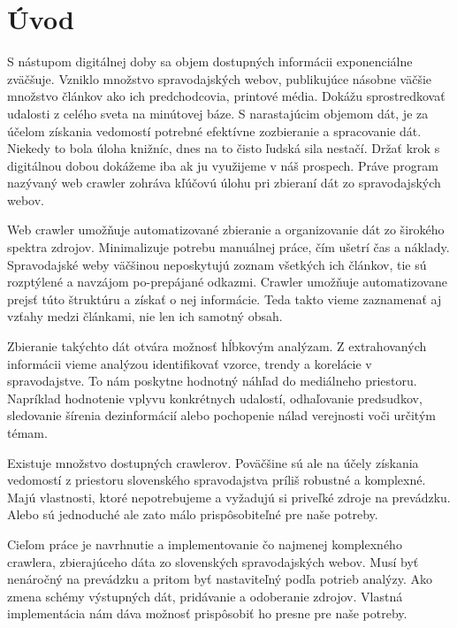 
{}

\chapter*{Úvod}

S nástupom digitálnej doby sa objem dostupných informácii exponenciálne zväčšuje. Vzniklo množstvo spravodajských webov, publikujúce násobne väčšie množstvo článkov ako ich predchodcovia, printové média. Dokážu sprostredkovať udalosti z celého sveta na minútovej báze. S narastajúcim objemom dát, je za účelom získania vedomostí potrebné efektívne zozbieranie a spracovanie dát. Niekedy to bola úloha knižníc, dnes na to čisto ľudská sila nestačí. Držať krok s digitálnou dobou dokážeme iba ak ju využijeme v náš prospech. Práve program nazývaný web crawler zohráva kľúčovú úlohu pri zbieraní dát zo spravodajských webov. 

Web crawler umožňuje automatizované zbieranie a organizovanie dát zo širokého spektra zdrojov. Minimalizuje potrebu manuálnej práce, čím ušetrí čas a náklady. Spravodajské weby väčšinou neposkytujú zoznam všetkých ich článkov, tie sú rozptýlené a navzájom po-prepájané odkazmi. Crawler umožňuje automatizovane prejsť túto štruktúru a získať o nej informácie. Teda takto vieme zaznamenať aj vzťahy medzi článkami, nie len ich samotný obsah. 

Zbieranie takýchto dát otvára možnosť hĺbkovým analýzam. Z extrahovaných informácii vieme analýzou identifikovať vzorce, trendy a korelácie v spravodajstve. To nám poskytne hodnotný náhľad do mediálneho priestoru. Napríklad hodnotenie vplyvu konkrétnych udalostí, odhaľovanie predsudkov, sledovanie šírenia dezinformácií alebo pochopenie nálad verejnosti voči určitým témam. 

Existuje množstvo dostupných crawlerov. Poväčšine sú ale na účely získania vedomostí z priestoru slovenského spravodajstva príliš robustné a komplexné. Majú vlastnosti, ktoré nepotrebujeme a vyžadujú si priveľké zdroje na prevádzku. Alebo sú jednoduché ale zato málo prispôsobiteľné pre naše potreby. 

Cieľom práce je navrhnutie a implementovanie čo najmenej komplexného crawlera, zbierajúceho dáta zo slovenských spravodajských webov. Musí byť nenáročný na prevádzku a pritom byť nastaviteľný podľa potrieb analýzy. Ako zmena schémy výstupných dát, pridávanie a odoberanie zdrojov. Vlastná implementácia nám dáva možnosť prispôsobiť ho presne pre naše potreby.


